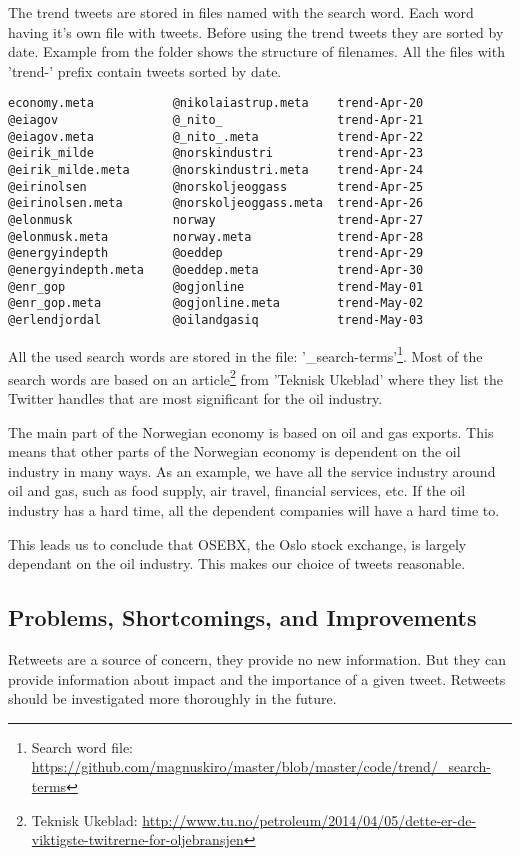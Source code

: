 The trend tweets are stored in files named with the search word. Each word
having it's own file with tweets. Before using the trend tweets they are sorted
by date. Example from the folder shows the structure of filenames. All the files
with 'trend-' prefix contain tweets sorted by date.   
\begin{verbatim}
economy.meta           @nikolaiastrup.meta    trend-Apr-20
@eiagov                @_nito_                trend-Apr-21
@eiagov.meta           @_nito_.meta           trend-Apr-22
@eirik_milde           @norskindustri         trend-Apr-23
@eirik_milde.meta      @norskindustri.meta    trend-Apr-24
@eirinolsen            @norskoljeoggass       trend-Apr-25
@eirinolsen.meta       @norskoljeoggass.meta  trend-Apr-26
@elonmusk              norway                 trend-Apr-27
@elonmusk.meta         norway.meta            trend-Apr-28
@energyindepth         @oeddep                trend-Apr-29
@energyindepth.meta    @oeddep.meta           trend-Apr-30
@enr_gop               @ogjonline             trend-May-01
@enr_gop.meta          @ogjonline.meta        trend-May-02
@erlendjordal          @oilandgasiq           trend-May-03
\end{verbatim}

All the used search words are stored in the file: '\_search-terms'\footnote{Search word file:
\url{https://github.com/magnuskiro/master/blob/master/code/trend/_search-terms}}.
Most of the search words are based on an article\footnote{Teknisk Ukeblad:
\url{http://www.tu.no/petroleum/2014/04/05/dette-er-de-viktigste-twitrerne-for-oljebransjen}}
from 'Teknisk Ukeblad' where they list the Twitter handles that are most
significant for the oil industry.

The main part of the Norwegian economy is based on oil and gas exports. This
means that other parts of the Norwegian economy is dependent on the oil
industry in many ways. As an example, we have all the service industry around
oil and gas, such as food supply, air travel, financial services, etc. If the
oil industry has a hard time, all the dependent companies will have a hard time
to. 
 
This leads us to conclude that OSEBX, the Oslo stock exchange, is largely
dependant on the oil industry. This makes our choice of tweets
reasonable. 
%

\subsection{Problems, Shortcomings, and Improvements}
Retweets are a source of concern, they provide no new information. But they can
provide information about impact and the importance of a given tweet. Retweets
should be investigated more thoroughly in the future.  

